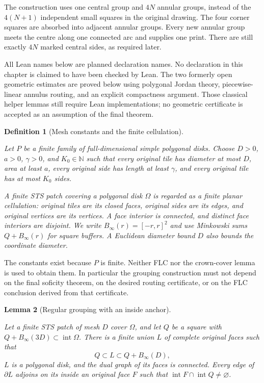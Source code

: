 \documentclass[11pt,a4paper]{article}
\newtheorem{definition}{Definition}[section]
\newtheorem{lemma}[definition]{Lemma}
\theoremstyle{remark}
\newcommand{\lean}[1]{}
\newcommand{\uses}[1]{}
\begin{document}
The construction uses one central group and $4N$ annular groups, instead of
the $4(N+1)$ independent small squares in the original drawing.  The four
corner squares are absorbed into adjacent annular groups.  Every new annular
group meets the centre along one connected arc and supplies one print.
There are still exactly $4N$ marked central sides, as required later.

All Lean names below are planned declaration names.  No declaration in this
chapter is claimed to have been checked by Lean.  The two formerly open
geometric estimates are proved below using polygonal Jordan theory,
piecewise-linear annulus routing, and an explicit compactness argument.
Those classical helper lemmas still require Lean implementations; no
geometric certificate is accepted as an assumption of the final theorem.

\begin{definition}[Mesh constants and the finite cellulation]
\label{def:mesh}
\lean{Tilings.Geometry.MeshConstants}
\uses{def:polygon,def:protoset,def:placed,def:tiling,def:sts}
Let $P$ be a finite family of full-dimensional simple polygonal disks.  Choose
$D>0$, $a>0$, $\gamma>0$, and $K_0\in\mathbb N$ such that every original
tile has diameter at most $D$, area at least $a$, every original side has
length at least $\gamma$, and every original tile has at most $K_0$ sides.

A finite STS patch covering a polygonal disk $\Omega$ is regarded as a finite
planar cellulation: original tiles are its closed faces, original sides are
its edges, and original vertices are its vertices.  A face interior is
connected, and distinct face interiors are disjoint.  We write
$B_\infty(r)=[-r,r]^2$ and use Minkowski sums $Q+B_\infty(r)$ for square
buffers.  A Euclidean diameter bound $D$ also bounds the coordinate diameter.
\end{definition}

The constants exist because $P$ is finite.  Neither FLC nor the crown-cover
lemma is used to obtain them.  In particular the grouping construction must
not depend on the final soficity theorem, on the desired routing certificate,
or on the FLC conclusion derived from that certificate.

\begin{lemma}[Regular grouping with an inside anchor]
\label{lem:regular-grouping}
\lean{Tilings.Geometry.regularGrouping}
\uses{def:mesh,def:tiling}
Let a finite STS patch of mesh $D$ cover $\Omega$, and let $Q$ be a square
with $Q+B_\infty(3D)\subset\operatorname{int}\Omega$.  There is a finite
union $L$ of complete original faces such that
\[
 Q\subset L\subset Q+B_\infty(D),
\]
$L$ is a polygonal disk, and the dual graph of its faces is connected.
Every edge of $\partial L$ adjoins on its inside an original face $F$ such
that $\operatorname{int}F\cap\operatorname{int}Q\ne\varnothing$.
\end{lemma}
\end{document}
